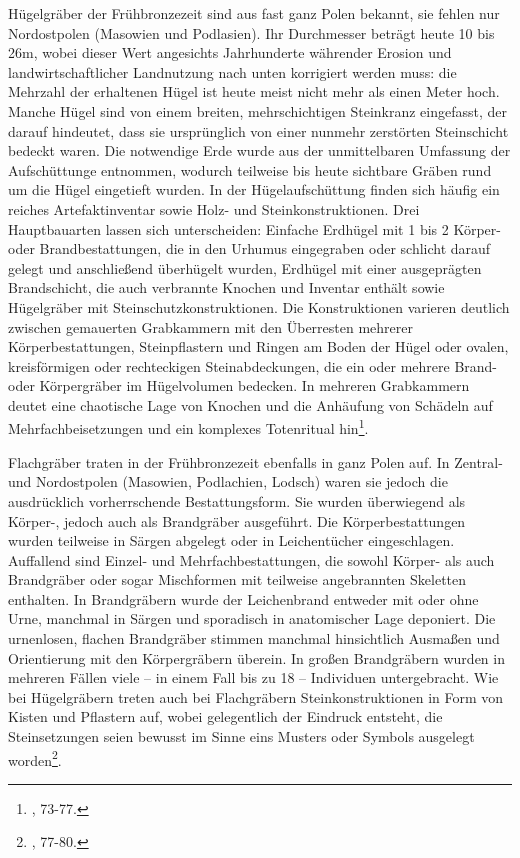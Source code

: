 \documentclass[openany,twoside,twocolumn]{book}
\let\rmarkdownfootnote\footnote%
\def\footnote{\protect\rmarkdownfootnote}
\begin{document}
Hügelgräber der Frühbronzezeit sind aus fast ganz Polen bekannt, sie
fehlen nur Nordostpolen (Masowien und Podlasien). Ihr Durchmesser
beträgt heute 10 bis 26m, wobei dieser Wert angesichts Jahrhunderte
währender Erosion und landwirtschaftlicher Landnutzung nach unten
korrigiert werden muss: die Mehrzahl der erhaltenen Hügel ist heute
meist nicht mehr als einen Meter hoch. Manche Hügel sind von einem
breiten, mehrschichtigen Steinkranz eingefasst, der darauf hindeutet,
dass sie ursprünglich von einer nunmehr zerstörten Steinschicht bedeckt
waren. Die notwendige Erde wurde aus der unmittelbaren Umfassung der
Aufschüttunge entnommen, wodurch teilweise bis heute sichtbare Gräben
rund um die Hügel eingetieft wurden. In der Hügelaufschüttung finden
sich häufig ein reiches Artefaktinventar sowie Holz- und
Steinkonstruktionen. Drei Hauptbauarten lassen sich unterscheiden:
Einfache Erdhügel mit 1 bis 2 Körper- oder Brandbestattungen, die in den
Urhumus eingegraben oder schlicht darauf gelegt und anschließend
überhügelt wurden, Erdhügel mit einer ausgeprägten Brandschicht, die
auch verbrannte Knochen und Inventar enthält sowie Hügelgräber mit
Steinschutzkonstruktionen. Die Konstruktionen varieren deutlich zwischen
gemauerten Grabkammern mit den Überresten mehrerer Körperbestattungen,
Steinpflastern und Ringen am Boden der Hügel oder ovalen, kreisförmigen
oder rechteckigen Steinabdeckungen, die ein oder mehrere Brand- oder
Körpergräber im Hügelvolumen bedecken. In mehreren Grabkammern deutet
eine chaotische Lage von Knochen und die Anhäufung von Schädeln auf
Mehrfachbeisetzungen und ein komplexes Totenritual hin\footnote{\textcite{dabrowski_aeltere_2004},
  73-77.}.

Flachgräber traten in der Frühbronzezeit ebenfalls in ganz Polen auf. In
Zentral- und Nordostpolen (Masowien, Podlachien, Lodsch) waren sie
jedoch die ausdrücklich vorherrschende Bestattungsform. Sie wurden
überwiegend als Körper-, jedoch auch als Brandgräber ausgeführt. Die
Körperbestattungen wurden teilweise in Särgen abgelegt oder in
Leichentücher eingeschlagen. Auffallend sind Einzel- und
Mehrfachbestattungen, die sowohl Körper- als auch Brandgräber oder sogar
Mischformen mit teilweise angebrannten Skeletten enthalten. In
Brandgräbern wurde der Leichenbrand entweder mit oder ohne Urne,
manchmal in Särgen und sporadisch in anatomischer Lage deponiert. Die
urnenlosen, flachen Brandgräber stimmen manchmal hinsichtlich Ausmaßen
und Orientierung mit den Körpergräbern überein. In großen Brandgräbern
wurden in mehreren Fällen viele -- in einem Fall bis zu 18 -- Individuen
untergebracht. Wie bei Hügelgräbern treten auch bei Flachgräbern
Steinkonstruktionen in Form von Kisten und Pflastern auf, wobei
gelegentlich der Eindruck entsteht, die Steinsetzungen seien bewusst im
Sinne eins Musters oder Symbols ausgelegt worden\footnote{\textcite{dabrowski_aeltere_2004},
  77-80.}.
\end{document}
